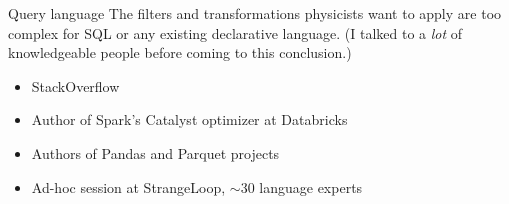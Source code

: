 \documentclass{beamer}
\begin{document}
\begin{frame}{Query language}
\small
\vspace{0.5 cm}
The filters and transformations physicists want to apply are too complex for SQL or any existing declarative language. (I talked to a {\it lot} of knowledgeable people before coming to this conclusion.)
\begin{itemize}
\item StackOverflow
\item Author of Spark's Catalyst optimizer at Databricks
\item Authors of Pandas and Parquet projects
\item Ad-hoc session at StrangeLoop, $\sim$30 language experts
\end{itemize}

\vspace{0.5 cm}

\vspace{0.5 cm}
\end{frame}
\end{document}
